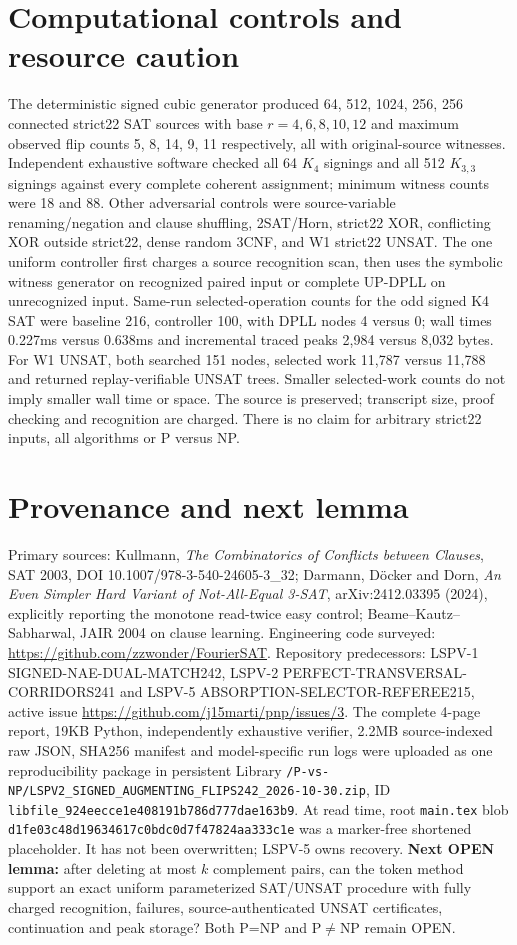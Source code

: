 \documentclass[10pt]{article}
\begin{document}
\section{Computational controls and resource caution}
The deterministic signed cubic generator produced 64, 512, 1024, 256, 256 connected strict22 SAT sources with base $r=4,6,8,10,12$ and maximum observed flip counts 5, 8, 14, 9, 11 respectively, all with original-source witnesses. Independent exhaustive software checked all 64 $K_4$ signings and all 512 $K_{3,3}$ signings against every complete coherent assignment; minimum witness counts were 18 and 88. Other adversarial controls were source-variable renaming/negation and clause shuffling, 2SAT/Horn, strict22 XOR, conflicting XOR outside strict22, dense random 3CNF, and W1 strict22 UNSAT.
The one uniform controller first charges a source recognition scan, then uses the symbolic witness generator on recognized paired input or complete UP-DPLL on unrecognized input. Same-run selected-operation counts for the odd signed K4 SAT were baseline 216, controller 100, with DPLL nodes 4 versus 0; wall times 0.227ms versus 0.638ms and incremental traced peaks 2,984 versus 8,032 bytes. For W1 UNSAT, both searched 151 nodes, selected work 11,787 versus 11,788 and returned replay-verifiable UNSAT trees. Smaller selected-work counts do not imply smaller wall time or space. The source is preserved; transcript size, proof checking and recognition are charged. There is no claim for arbitrary strict22 inputs, all algorithms or P versus NP.
\section{Provenance and next lemma}
Primary sources: Kullmann, \emph{The Combinatorics of Conflicts between Clauses}, SAT 2003, DOI 10.1007/978-3-540-24605-3\_32; Darmann, D\"ocker and Dorn, \emph{An Even Simpler Hard Variant of Not-All-Equal 3-SAT}, arXiv:2412.03395 (2024), explicitly reporting the monotone read-twice easy control; Beame--Kautz--Sabharwal, JAIR 2004 on clause learning. Engineering code surveyed: \url{https://github.com/zzwonder/FourierSAT}. Repository predecessors: LSPV-1 SIGNED-NAE-DUAL-MATCH242, LSPV-2 PERFECT-TRANSVERSAL-CORRIDORS241 and LSPV-5 ABSORPTION-SELECTOR-REFEREE215, active issue \url{https://github.com/j15marti/pnp/issues/3}. The complete 4-page report, 19KB Python, independently exhaustive verifier, 2.2MB source-indexed raw JSON, SHA256 manifest and model-specific run logs were uploaded as one reproducibility package in persistent Library \texttt{/P-vs-NP/LSPV2\_SIGNED\_AUGMENTING\_FLIPS242\_2026-10-30.zip}, ID \texttt{libfile\_924eecce1e408191b786d777dae163b9}.
At read time, root \texttt{main.tex} blob \texttt{d1fe03c48d19634617c0bdc0d7f47824aa333c1e} was a marker-free shortened placeholder. It has not been overwritten; LSPV-5 owns recovery. \textbf{Next OPEN lemma:} after deleting at most $k$ complement pairs, can the token method support an exact uniform parameterized SAT/UNSAT procedure with fully charged recognition, failures, source-authenticated UNSAT certificates, continuation and peak storage? Both P=NP and P$\ne$NP remain OPEN.
\end{document}
